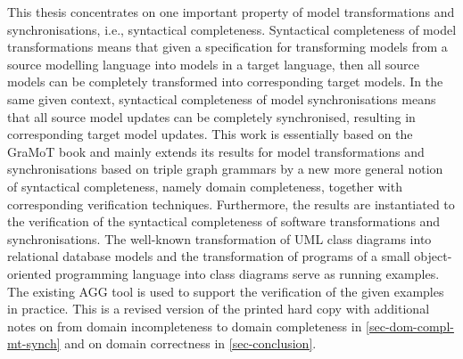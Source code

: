 \documentclass{eceasst}
\begin{document}
This thesis concentrates on one important property of model transformations and synchronisations, i.e., syntactical completeness.
Syntactical completeness of model transformations means that given a specification for transforming models from a source modelling language into models in a target language, then all source models can be completely transformed into corresponding target models.
In the same given context, syntactical completeness of model synchronisations means that all source model updates can be completely synchronised, resulting in corresponding target model updates.
This work is essentially based on the GraMoT book and mainly extends its results for model transformations and synchronisations based on triple graph grammars by a new more general notion of syntactical completeness, namely domain completeness, together with corresponding verification techniques.
Furthermore, the results are instantiated to the verification of the syntactical completeness of software transformations and synchronisations.
The well-known transformation of UML class diagrams into relational database models and the transformation of programs of a small object-oriented programming language into class diagrams serve as running examples.
The existing AGG tool is used to support the verification of the given examples in practice.
This is a revised version of the printed hard copy with additional notes on from domain incompleteness to domain completeness in \cref{sec-dom-compl-mt-synch} and on domain correctness in \cref{sec-conclusion}.
\end{document}

